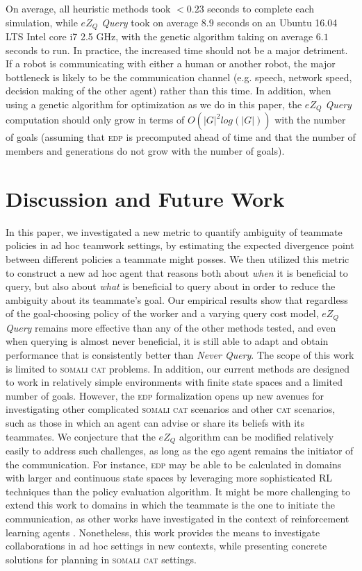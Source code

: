 \documentclass[letterpaper]{article}
\begin{document}
On average, all heuristic methods took $<0.23$ seconds to complete each simulation, while \emph{$eZ_Q$ Query} took on average $8.9$ seconds on an Ubuntu 16.04 LTS Intel core i7 2.5 GHz, with the genetic algorithm taking on average $6.1$ seconds to run. In practice, the increased time should not be a major detriment. If a robot is communicating with either a human or another robot, the major bottleneck is likely to be the communication channel (e.g. speech, network speed, decision making of the other agent) rather than this time. In addition, when using a genetic algorithm for optimization as we do in this paper, the \emph{$eZ_Q$ Query} computation should only grow in terms of $O(|G|^2log(|G|))$ with the number of goals (assuming that \textsc{edp} is precomputed ahead of time and that the number of members and generations do not grow with the number of goals).






\vspace{-3.56mm}
\section{Discussion and Future Work}
In this paper, we investigated a new metric to quantify ambiguity of teammate policies in ad hoc teamwork settings, by estimating the expected divergence point between different policies a teammate might posses. We then utilized this metric to construct a new ad hoc agent that reasons both about \emph{when} it is beneficial to query, but also about \emph{what} is beneficial to query about in order to reduce the ambiguity about its teammate's goal. Our empirical results show that regardless of the goal-choosing policy of the worker and a varying query cost model, \emph{$eZ_Q$ Query} remains more effective than any of the other methods tested, and even when querying is almost never beneficial, it is still able to adapt and obtain performance that is consistently better than \emph{Never Query}.  The scope of this work is limited to \textsc{somali cat} problems. In addition, our current methods are designed to work in relatively simple environments with finite state spaces and a limited number of goals. However, the \textsc{edp} formalization opens up new avenues for investigating other %
complicated \textsc{somali cat} scenarios and other \textsc{cat} scenarios, such as those in which an agent can advise or share its beliefs with its teammates. We conjecture that the $eZ_Q$ algorithm can be modified relatively easily to address such challenges, as long as the ego agent remains the initiator of the communication. For instance, \textsc{edp} may be able to be calculated in domains with larger and continuous state spaces by leveraging more sophisticated RL techniques than the policy evaluation algorithm. It might be more challenging to extend this work to domains in which the teammate is the one to initiate the communication, as other works have investigated in the context of reinforcement learning agents \cite{torrey2013teaching,cui2018active}. Nonetheless, this work provides the means to investigate collaborations in ad hoc settings in new contexts, while presenting concrete solutions for planning in \textsc{somali cat} settings.
\end{document}
